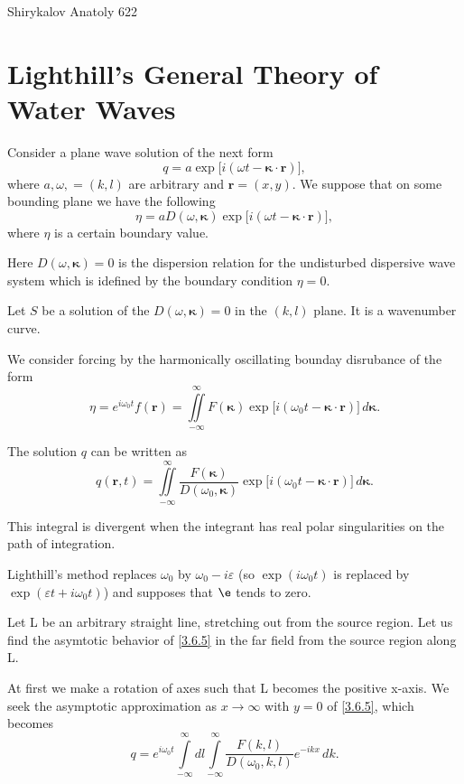 \begin{center}
  Shirykalov Anatoly 622
\end{center}
\newcommand{\eexp}[1][]{\exp\big[i(\omega#1 t - \boldsymbol\kappa\cdot \boldsymbol r)\big]}
\section{Lighthill's General Theory of Water Waves}
Consider a plane wave solution of the next form
\[
  q = a \eexp,
\]
where $a, \omega, \boldsymbol = (k, l)$ are arbitrary and $\boldsymbol r = (x,y)$. We suppose that on some bounding plane we have the following
\[
  \eta = a D(\omega, \boldsymbol\kappa)\eexp,
\]
where $\eta$ is a certain boundary value.

Here $D(\omega, \boldsymbol \kappa) = 0$ is the dispersion relation for the undisturbed dispersive wave system  which is idefined by the boundary condition $\eta = 0$.

Let $S$ be a solution of the $D(\omega, \boldsymbol\kappa) = 0$ in the $(k,l)$ plane. It is a wavenumber curve.

We consider forcing by the harmonically oscillating bounday disrubance of the form
\[
  \eta = e^{i \omega_0 t}f(\boldsymbol r) = \iint\limits_{-\infty}^{\infty}
  F(\boldsymbol\kappa) \eexp[_0]\,d\boldsymbol\kappa.
\]

The solution $q$ can be written as
\begin{equation}\label{3.6.5}
  q(\boldsymbol r, t) = \iint\limits_{-\infty}^\infty \frac{F(\boldsymbol\kappa)}{D(\omega_0, \boldsymbol\kappa)}\eexp[_0]\,d\boldsymbol\kappa.
\end{equation}

This integral is divergent when the integrant has real polar singularities on the path of integration.

Lighthill's method replaces $\omega_0$ by $\omega_0-i\varepsilon$ (so $\exp(i\omega_0 t)$ is replaced by $\exp(\varepsilon t + i\omega_0 t)$) and supposes that $\e$ tends to zero.

Let L be an arbitrary straight line, stretching out from the source region. Let us find the asymtotic behavior of \eqref{3.6.5} in the far field from the source region along L.

At first we make a rotation of axes such that L becomes the positive x-axis. We seek the asymptotic approximation as $x\to \infty$ with $y=0$ of \eqref{3.6.5}, which becomes
\begin{equation}\label{3.6.7}
  q = e^{i\omega_0 t}\int\limits_{-\infty}^{\infty} dl \int\limits_{-\infty}^\infty \frac{F(k,l)}{D(\omega_0, k, l)} e^{-i k x}\,dk.
\end{equation}

